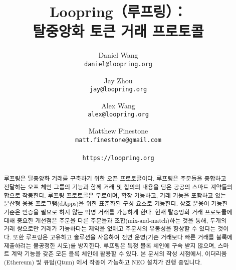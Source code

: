 \documentclass{article}
\title{\textbf{Loopring（루프링）：\\ 탈중앙화 토큰 거래 프로토콜}}
\author{	
	Daniel Wang\\	
	\texttt{daniel@loopring.org}\\	
	\and	
	Jay Zhou\\	
	\texttt{jay@loopring.org}\\	
	\and	
	Alex Wang\\	
	\texttt{alex@loopring.org}\\	
	\and	
	Matthew Finestone\\	
	\texttt{matt.finestone@gmail.com}\\	
	\\	
	\texttt{https://loopring.org}	
}
\begin{document}
\maketitle

\begin{abstract}
루프링은 탈중앙화 거래를 구축하기 위한 오픈 프로토콜이다. 루프링은 주문들을 종합하고 전달하는 오프 체인 그룹의 기능과 함께 거래 및 합의의 내용을 담은 공공의 스마트 계약들의 합으로 작동한다. 루프링 프로토콜은 무료이며, 확장 가능하고, 거래 기능을 포함하고 있는 분산형 응용 프로그램(dApps)을 위한 표준화된 구성 요소로 기능한다. 상호 운용이 가능한 기준은 인증을 필요로 하지 않는 익명 거래를 가능하게 한다. 현재 탈중앙화 거래 프로토콜에 대해 중요한 개선점은 주문을 다른 주문들과 조합(mix-and-match)하는 것을 통해, 두개의 거래 쌍으로만 거래가 가능하다는 제약을 없애고 주문서의 유동성을 향상할 수 있다는 것이다. 또한 루프링은 고유하고 솔루션을 사용하여 전면 운영(기존 거래보다 빠른 거래를 블록에 제출하려는 불공정한 시도)를 방지한다. 루프링은 특정 블록 체인에 구속 받지 않으며, 스마트 계약 기능을 갖춘 모든 블록 체인에 활용할 수 있다. 본 문서의 작성 시점에서, 이더리움(Ethereum)  \cite{buterin2017ethereum} \cite{wood2014ethereum} 및 큐텀(Qtum) \cite{dai2017smart}에서 작동이 가능하고 NEO \cite{atterlonn2018distributed} 설치가 진행 중입니다.
\end{abstract}
\end{document}
